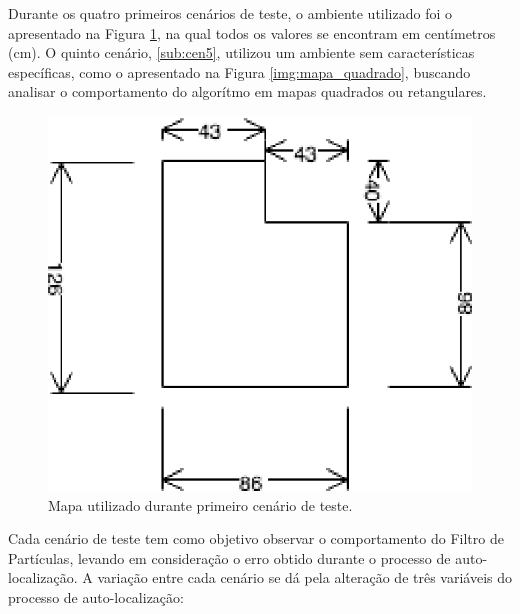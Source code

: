 Durante os quatro primeiros cenários de teste, o ambiente utilizado foi o apresentado na Figura \ref{img:map1}, na qual todos os
valores se encontram em centímetros (cm). O quinto cenário, \ref{sub:cen5}, utilizou um ambiente sem características específicas, como o apresentado
na Figura \ref{img:mapa_quadrado}, buscando analisar o comportamento do algorítmo em mapas quadrados ou retangulares.

\begin{figure}[H]
	\centering
	\includegraphics[scale=1.3]{figuras/map1.eps}
	\caption[Primeiro Cenário de Teste]{Mapa utilizado durante primeiro cenário de teste.}
	\label{img:map1}
\end{figure}


Cada cenário de teste tem como objetivo observar o comportamento do Filtro de Partículas, levando em consideração o erro obtido
durante o processo de auto-localização. A variação entre cada cenário se dá pela alteração de três variáveis do processo de auto-localização:

